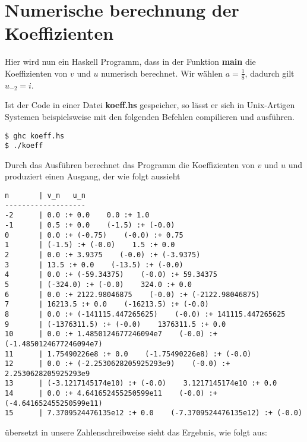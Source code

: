 \chapter{Numerische berechnung der Koeffizienten}
Hier wird nun ein Haskell Programm, dass in der Funktion \textbf{main} die
Koeffizienten von $v$ und $u$ numerisch berechnet. Wir wählen $a=\frac{1}{8}$,
dadurch gilt $u_{-2}=i$.


Ist der Code in einer Datei \textbf{koeff.hs} gespeicher, so lässt er sich
in Unix-Artigen Systemen beispielsweise mit den folgenden Befehlen compilieren
und ausführen.
\begin{lstlisting}[style=Bash]
$ ghc koeff.hs
$ ./koeff
\end{lstlisting}
Durch das Ausführen berechnet das Programm die Koeffizienten von $v$ und $u$
und produziert einen Ausgang, der wie folgt aussieht
\begin{lstlisting}[style=Bash]
n       | v_n   u_n
-------------------
-2      | 0.0 :+ 0.0    0.0 :+ 1.0
-1      | 0.5 :+ 0.0    (-1.5) :+ (-0.0)
0       | 0.0 :+ (-0.75)    (-0.0) :+ 0.75
1       | (-1.5) :+ (-0.0)    1.5 :+ 0.0
2       | 0.0 :+ 3.9375    (-0.0) :+ (-3.9375)
3       | 13.5 :+ 0.0    (-13.5) :+ (-0.0)
4       | 0.0 :+ (-59.34375)    (-0.0) :+ 59.34375
5       | (-324.0) :+ (-0.0)    324.0 :+ 0.0
6       | 0.0 :+ 2122.98046875    (-0.0) :+ (-2122.98046875)
7       | 16213.5 :+ 0.0    (-16213.5) :+ (-0.0)
8       | 0.0 :+ (-141115.447265625)    (-0.0) :+ 141115.447265625
9       | (-1376311.5) :+ (-0.0)    1376311.5 :+ 0.0
10      | 0.0 :+ 1.4850124677246094e7    (-0.0) :+ (-1.4850124677246094e7)
11      | 1.75490226e8 :+ 0.0    (-1.75490226e8) :+ (-0.0)
12      | 0.0 :+ (-2.2530628205925293e9)    (-0.0) :+ 2.2530628205925293e9
13      | (-3.1217145174e10) :+ (-0.0)    3.1217145174e10 :+ 0.0
14      | 0.0 :+ 4.641652455250599e11    (-0.0) :+ (-4.641652455250599e11)
15      | 7.3709524476135e12 :+ 0.0    (-7.3709524476135e12) :+ (-0.0)
\end{lstlisting}
übersetzt in unsere Zahlenschreibweise sieht das Ergebnis, wie folgt aus:
